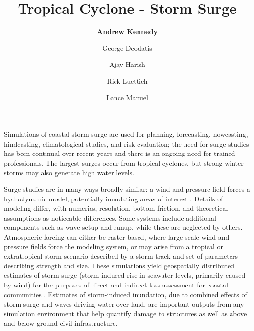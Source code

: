 %
%
%

\title{Tropical Cyclone - Storm Surge}
\author{
    \textbf{Andrew Kennedy} 
    \and {George Deodatis}
    \and {Ajay Harish}
    \and {Rick Luettich}
    \and {Lance Manuel}}
\tocauthor{}
%
%
\maketitle

Simulations of coastal storm surge are used for planning, forecasting, nowcasting, hindcasting, climatological studies, and risk evaluation; the need for surge studies has been continual over recent years and there is an ongoing need for trained professionals. The largest surges occur from tropical cyclones, but strong winter storms may also generate high water levels.

Surge studies are in many ways broadly similar: a wind and pressure field forces a hydrodynamic model, potentially inundating areas of interest \citep{njcoast2018implementation}. Details of modeling differ, with numerics, resolution, bottom friction, and theoretical assumptions as noticeable differences. Some systems include additional components such as wave setup and runup, while these are neglected by others. Atmospheric forcing can either be raster-based, where large-scale wind and pressure fields force the modeling system, or may arise from a tropical or extratropical storm scenario described by a storm track and set of parameters describing strength and size. These simulations yield geospatially distributed estimates of storm surge (storm-induced rise in seawater levels, primarily caused by wind) for the purposes of direct and indirect loss assessment for coastal communities \citep{jacob2011responding}. Estimates of storm-induced inundation, due to combined effects of storm surge and waves driving water over land, are important outputs from any simulation environment that help quantify damage to structures as well as above and below ground civil infrastructure.


